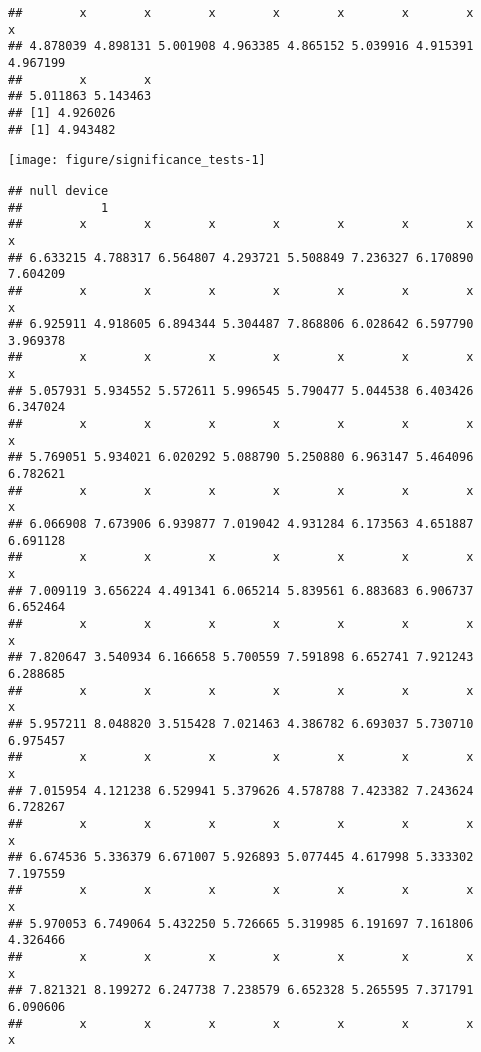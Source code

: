 \documentclass[a4paper,10pt]{book}\usepackage[]{graphicx}\usepackage[]{color}
\makeatletter
\def\maxwidth{ %
  \ifdim\Gin@nat@width>\linewidth
    \linewidth
  \else
    \Gin@nat@width
  \fi
}
\newenvironment{kframe}{%
 \def\at@end@of@kframe{}%
 \ifinner\ifhmode%
  \def\at@end@of@kframe{\end{minipage}}%
  \begin{minipage}{\columnwidth}%
 \fi\fi%
 \def\FrameCommand##1{\hskip\@totalleftmargin \hskip-\fboxsep
 \colorbox{shadecolor}{##1}\hskip-\fboxsep
     \hskip-\linewidth \hskip-\@totalleftmargin \hskip\columnwidth}%
 \MakeFramed {\advance\hsize-\width
   \@totalleftmargin\z@ \linewidth\hsize
   \@setminipage}}%
 {\par\unskip\endMakeFramed%
 \at@end@of@kframe}
\newenvironment{knitrout}{}{} %
\makeatother
\begin{document}
\begin{knitrout}
\color{fgcolor}\begin{kframe}
\begin{verbatim}
##        x        x        x        x        x        x        x        x 
## 4.878039 4.898131 5.001908 4.963385 4.865152 5.039916 4.915391 4.967199 
##        x        x 
## 5.011863 5.143463
## [1] 4.926026
## [1] 4.943482
\end{verbatim}
\end{kframe}
\texttt{[image: figure/significance\_tests-1]} 
\begin{kframe}\begin{verbatim}
## null device 
##           1
##        x        x        x        x        x        x        x        x 
## 6.633215 4.788317 6.564807 4.293721 5.508849 7.236327 6.170890 7.604209 
##        x        x        x        x        x        x        x        x 
## 6.925911 4.918605 6.894344 5.304487 7.868806 6.028642 6.597790 3.969378 
##        x        x        x        x        x        x        x        x 
## 5.057931 5.934552 5.572611 5.996545 5.790477 5.044538 6.403426 6.347024 
##        x        x        x        x        x        x        x        x 
## 5.769051 5.934021 6.020292 5.088790 5.250880 6.963147 5.464096 6.782621 
##        x        x        x        x        x        x        x        x 
## 6.066908 7.673906 6.939877 7.019042 4.931284 6.173563 4.651887 6.691128 
##        x        x        x        x        x        x        x        x 
## 7.009119 3.656224 4.491341 6.065214 5.839561 6.883683 6.906737 6.652464 
##        x        x        x        x        x        x        x        x 
## 7.820647 3.540934 6.166658 5.700559 7.591898 6.652741 7.921243 6.288685 
##        x        x        x        x        x        x        x        x 
## 5.957211 8.048820 3.515428 7.021463 4.386782 6.693037 5.730710 6.975457 
##        x        x        x        x        x        x        x        x 
## 7.015954 4.121238 6.529941 5.379626 4.578788 7.423382 7.243624 6.728267 
##        x        x        x        x        x        x        x        x 
## 6.674536 5.336379 6.671007 5.926893 5.077445 4.617998 5.333302 7.197559 
##        x        x        x        x        x        x        x        x 
## 5.970053 6.749064 5.432250 5.726665 5.319985 6.191697 7.161806 4.326466 
##        x        x        x        x        x        x        x        x 
## 7.821321 8.199272 6.247738 7.238579 6.652328 5.265595 7.371791 6.090606 
##        x        x        x        x        x        x        x        x 

\end{verbatim}
\end{kframe}
\end{knitrout}
\end{document}
